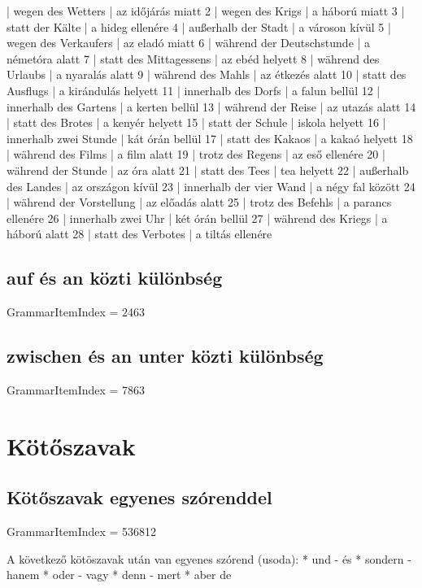 \documentclass{article}
\newenvironment{desc}{\verbatim}{\endverbatim}
\newenvironment{exmp}{\verbatim}{\endverbatim}
\begin{document}
\begin{exmp}
1 | wegen des Wetters | az időjárás miatt
2 | wegen des Krigs | a háború miatt
3 | statt der Kälte | a hideg ellenére
4 | außerhalb der Stadt | a városon kívül
5 | wegen des Verkaufers | az eladó miatt
6 | während der Deutschstunde | a németóra alatt
7 | statt des Mittagessens | az ebéd helyett
8 | während des Urlaubs | a nyaralás alatt
9 | während des Mahls | az étkezés alatt
10 | statt des Ausflugs | a kirándulás helyett
11 | innerhalb des Dorfs | a falun bellül
12 | innerhalb des Gartens | a kerten bellül
13 | während der Reise | az utazás alatt
14 | statt des Brotes | a kenyér helyett
15 | statt der Schule | iskola helyett
16 | innerhalb zwei Stunde | kát órán bellül
17 | statt des Kakaos | a kakaó helyett
18 | während des Films | a film alatt
19 | trotz des Regens | az eső ellenére
20 | während der Stunde | az óra alatt
21 | statt des Tees | tea helyett
22 | außerhalb des Landes | az országon kívül
23 | innerhalb der vier Wand | a négy fal között
24 | während der Vorstellung | az előadás alatt
25 | trotz des Befehls | a parancs ellenére
26 | innerhalb zwei Uhr | két órán bellül
27 | während des Kriegs | a háború alatt
28 | statt des Verbotes | a tiltás ellenére
\end{exmp}

\subsection{auf és an közti különbség}

GrammarItemIndex = 2463

\subsection{zwischen és an unter közti különbség}

GrammarItemIndex = 7863

\section{Kötőszavak}

\subsection{Kötőszavak egyenes szórenddel}

GrammarItemIndex = 536812

\begin{desc}
A következő kötöszavak után van egyenes szórend (usoda):
* und - és
* sondern - hanem
* oder - vagy
* denn - mert
* aber  de
\end{desc}
\end{document}
